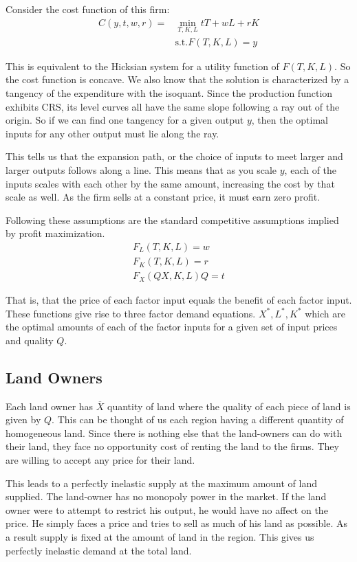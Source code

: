 \documentclass[12pt]{paper}
\begin{document}
Consider the cost function of this firm:
\begin{align*}
  C(y,t,w,r) = &\min_{T,K,L} tT + wL + rK\\
  &\text{s.t.} F(T,K,L) = y
\end{align*}

This is equivalent to the Hicksian system for a utility function of
$F(T,K,L)$. So the cost function is concave. We also know that the
solution is characterized by a tangency of the expenditure with the
isoquant. Since the production function exhibits CRS, its level curves
all have the same slope following a ray out of the origin. So if we
can find one tangency for a given output $y$, then the optimal
inputs for any other output must lie along the ray.

This tells us that the expansion path, or the choice of inputs to meet
larger and larger outputs follows along a line. This means that as you
scale $y$, each of the inputs scales with each other by the same
amount, increasing the cost by that scale as well. As the firm sells
at a constant price, it must earn zero profit.

Following these assumptions are the standard competitive assumptions
implied by profit maximization.
\begin{align*}
  F_L(T,K,L) = w\\
  F_K(T,K,L) = r\\
  F_X(QX,K,L)Q = t
\end{align*}

That is, that the price of each factor input equals the benefit of
each factor input. These functions give rise to three factor demand
equations. $X^{*}, L^{*}, K^{*}$ which are the optimal amounts of each
of the factor inputs for a given set of input prices and quality $Q$.

\subsection*{Land Owners}

Each land owner has $\overline{X}$ quantity of land where the quality of each
piece of land is given by $Q$. This can be thought of us each region
having a different quantity of homogeneous land. Since there is
nothing else that the land-owners can do with their land, they face no
opportunity cost of renting the land to the firms. They are willing to
accept any price for their land.

This leads to a perfectly inelastic supply at the maximum amount of
land supplied. The land-owner has no monopoly power in the market.
If the land owner were to attempt to restrict his output, he would
have no affect on the price. He simply faces a price and tries to sell as
much of his land as possible. As a result supply is fixed at the
amount of land in the region. This gives us perfectly inelastic demand
at the total land.
\end{document}
